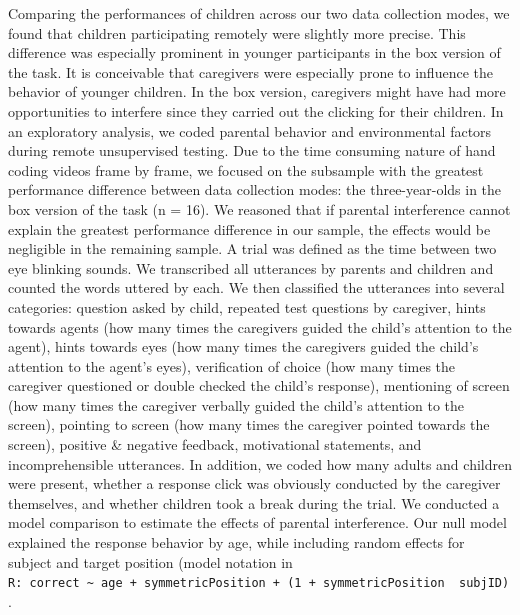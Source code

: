 \documentclass[
  man,floatsintext]{apa6}
\begin{document}
Comparing the performances of children across our two data collection modes, we found that children participating remotely were slightly more precise.
This difference was especially prominent in younger participants in the box version of the task.
It is conceivable that caregivers were especially prone to influence the behavior of younger children.
In the box version, caregivers might have had more opportunities to interfere since they carried out the clicking for their children.
In an exploratory analysis, we coded parental behavior and environmental factors during remote unsupervised testing.
Due to the time consuming nature of hand coding videos frame by frame, we focused on the subsample with the greatest performance difference between data collection modes: the three-year-olds in the box version of the task (n = 16).
We reasoned that if parental interference cannot explain the greatest performance difference in our sample, the effects would be negligible in the remaining sample.
A trial was defined as the time between two eye blinking sounds.
We transcribed all utterances by parents and children and counted the words uttered by each.
We then classified the utterances into several categories: question asked by child, repeated test questions by caregiver, hints towards agents (how many times the caregivers guided the child's attention to the agent), hints towards eyes (how many times the caregivers guided the child's attention to the agent's eyes), verification of choice (how many times the caregiver questioned or double checked the child's response), mentioning of screen (how many times the caregiver verbally guided the child's attention to the screen), pointing to screen (how many times the caregiver pointed towards the screen), positive \& negative feedback, motivational statements, and incomprehensible utterances.
In addition, we coded how many adults and children were present, whether a response click was obviously conducted by the caregiver themselves, and whether children took a break during the trial.
We conducted a model comparison to estimate the effects of parental interference.
Our null model explained the response behavior by age, while including random effects for subject and target position (model notation in \texttt{R:\ correct\ \textasciitilde{}\ age\ +\ symmetricPosition\ +\ (1\ +\ symmetricPosition\ \textbar{}\ subjID)}.
\end{document}
